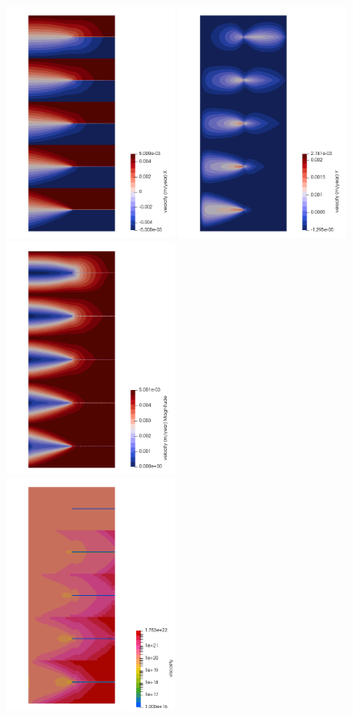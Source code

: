 \begin{center}
\includegraphics[width=5.52cm]{python_codes/fieldstone_87/results/experiment_07/u}
\includegraphics[width=5.52cm]{python_codes/fieldstone_87/results/experiment_07/v}
\includegraphics[width=5.52cm]{python_codes/fieldstone_87/results/experiment_07/vel}\\
\includegraphics[width=5.52cm]{python_codes/fieldstone_87/results/experiment_07/eta}

\end{center}
